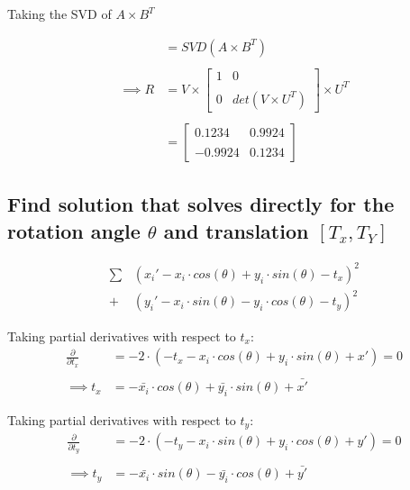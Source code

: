 \documentclass[12pt, oneside]{article}
\begin{document}
Taking the SVD of $A \times B^{T}$

\begin{align*}
    [U, S, V^T] &= SVD(A \times B^{T}) \\ \\
    \implies R &= V \times
    \begin{bmatrix} 1 & 0 \\ \\ 
        0 & det(V \times U^T) 
    \end{bmatrix}  \times U^T \\ \\
    &= \begin{bmatrix} 0.1234 & 0.9924 \\ \\ 
        -0.9924 & 0.1234
    \end{bmatrix}  
\end{align*}

\subsection{Find solution that solves directly for the rotation angle $\theta$
and translation $[T_x, T_Y]$}

\begin{align*}
    \sum_{}{} &({x_i}' - x_i \cdot cos(\theta) + y_i \cdot sin(\theta) -t_x)^2 \\
            +&({y_i}' - x_i \cdot sin(\theta) - y_i \cdot cos(\theta) -t_y)^2
\end{align*}

Taking partial derivatives with respect to $t_x$:
\begin{align*}
    \frac{\partial }{\partial t_x} &=  -2 \cdot (-t_x - x_i \cdot cos(\theta) 
    + y_i \cdot sin(\theta) + x') = 0 \\ \\
    \implies t_x &= -\bar{x_i} \cdot cos(\theta) + 
                    \bar{y_i} \cdot sin(\theta) + \bar{x'}
\end{align*}

Taking partial derivatives with respect to $t_y$:
\begin{align*}
    \frac{\partial }{\partial t_y} &=  -2 \cdot (-t_y - x_i \cdot sin(\theta) 
    + y_i \cdot cos(\theta) + y') = 0 \\ \\
    \implies t_y &= -\bar{x_i} \cdot sin(\theta) -
                    \bar{y_i} \cdot cos(\theta) + \bar{y'}
\end{align*}
\end{document}

